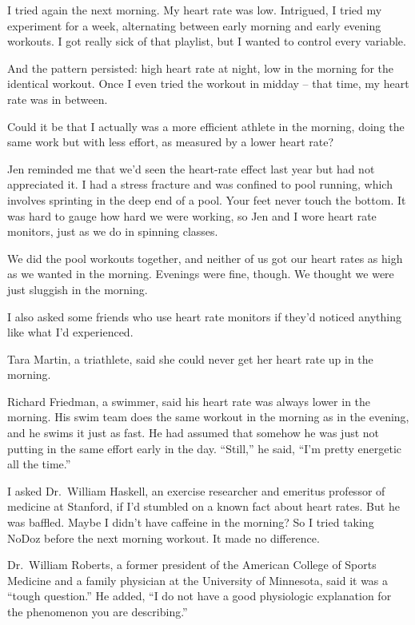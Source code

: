 ﻿\documentclass[12pt]{article}
\begin{document}
I tried again the next morning. My heart rate was low. Intrigued, I tried my experiment for a week,
alternating between early morning and early evening workouts. I got really sick of that playlist,
but I wanted to control every variable.

And the pattern persisted: high heart rate at night, low in the morning for the identical workout.
Once I even tried the workout in midday -- that time, my heart rate was in between.

Could it be that I actually was a more efficient athlete in the morning, doing the same work but
with less effort, as measured by a lower heart rate?

Jen reminded me that we'd seen the heart-rate effect last year but had not appreciated it. I had a
stress fracture and was confined to pool running, which involves sprinting in the deep end of a
pool. Your feet never touch the bottom. It was hard to gauge how hard we were working, so Jen and I
wore heart rate monitors, just as we do in spinning classes.

We did the pool workouts together, and neither of us got our heart rates as high as we wanted in the
morning. Evenings were fine, though. We thought we were just sluggish in the morning.

I also asked some friends who use heart rate monitors if they'd noticed anything like what I'd
experienced.

Tara Martin, a triathlete, said she could never get her heart rate up in the morning.

Richard Friedman, a swimmer, said his heart rate was always lower in the morning. His swim team does
the same workout in the morning as in the evening, and he swims it just as fast. He had assumed that
somehow he was just not putting in the same effort early in the day. ``Still,'' he said, ``I'm
pretty energetic all the time.''

I asked Dr.~William Haskell, an exercise researcher and emeritus professor of medicine at Stanford,
if I'd stumbled on a known fact about heart rates. But he was baffled. Maybe I didn't have caffeine
in the morning? So I tried taking NoDoz before the next morning workout. It made no difference.

Dr.~William Roberts, a former president of the American College of Sports Medicine and a family
physician at the University of Minnesota, said it was a ``tough question.'' He added, ``I do not
have a good physiologic explanation for the phenomenon you are describing.''
\end{document}
